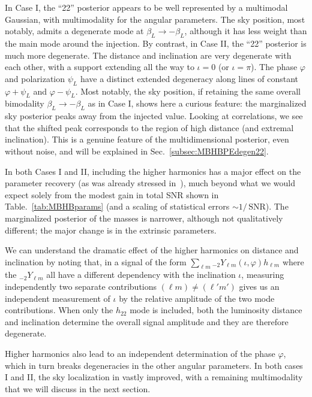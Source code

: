 \documentclass[aps,showpacs,twocolumn,prd,superscriptaddress,nofootinbib]{revtex4-1}
\newcommand{\SNR}{\,\mathrm{SNR}}
\newcommand\betaL{{\beta_{L}}}
\newcommand\psiL{{\psi_{L}}}
\newcommand{\sYlm}{{}_{-2}Y_{\ell m}}
\begin{document}
In Case I, the ``22'' posterior appears to be well represented by a multimodal Gaussian, with multimodality for the angular parameters. The sky position, most notably, admits a degenerate mode at $\betaL \rightarrow -\betaL$, although it has less weight than the main mode around the injection. By contrast, in Case II, the ``22'' posterior is much more degenerate. The distance and inclination are very degenerate with each other, with a support extending all the way to $\iota=0$ (or $\iota=\pi$). The phase $\varphi$ and polarization $\psiL$ have a distinct extended degeneracy along lines of constant $\varphi + \psiL$ and $\varphi - \psiL$. Most notably, the sky position, if retaining the same overall bimodality $\betaL \rightarrow -\betaL$ as in Case I, shows here a curious feature: the marginalized sky posterior peaks away from the injected value. Looking at correlations, we see that the shifted peak corresponds to the region of high distance (and extremal inclination). This is a genuine feature of the multidimensional posterior, even without noise,  and will be explained in Sec.~\ref{subsec:MBHBPEdegen22}.

In both Cases I and II, including the higher harmonics has a major effect on the parameter recovery (as was already stressed in~\cite{Arun+07a, TriasSintes07, PorterCornish08, McWilliams+09}), much beyond what we would expect solely from the modest gain in total SNR shown in Table.~\ref{tab:MBHBparams} (and a scaling of statistical errors $\sim 1/\SNR$). The marginalized posterior of the masses is narrower, although not qualitatively different; the major change is in the extrinsic parameters.

We can understand the dramatic effect of the higher harmonics on distance and inclination by noting that, in a signal of the form $\sum_{\ell m} \sYlm(\iota, \varphi)h_{\ell m}$ where the $\sYlm$ all have a different dependency with the inclination $\iota$, measuring independently two separate contributions $(\ell m) \neq (\ell' m')$ gives us an independent measurement of $\iota$ by the relative amplitude of the two mode contributions.
When only the $h_{22}$ mode is included, both the luminosity distance and inclination determine the overall signal amplitude and they are therefore degenerate.

Higher harmonics also lead to an independent determination of the phase $\varphi$, which in turn breaks degeneracies in the other angular parameters. In both cases I and II, the sky localization in vastly improved, with a remaining multimodality that we will discuss in the next section.
\end{document}

